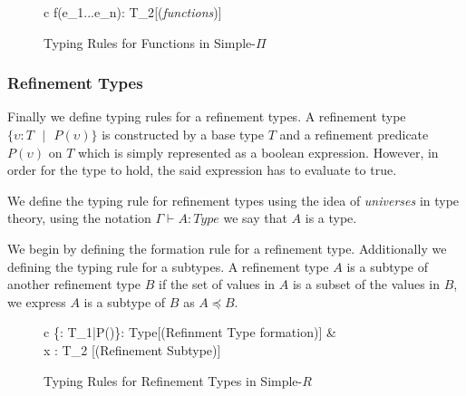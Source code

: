 \documentclass[a4paper,12pt]{report}
\begin{document}
\begin{figure}[H]
  \begin{center}
    \begin{tabular} {c}
        {\Gamma \vdash f(e_1...e_n): T_2}[(\textit{functions})]
    \end{tabular}
  \end{center}
  \caption{Typing Rules for Functions in Simple-$\Pi$}
\end{figure}

\subsubsection{Refinement Types}
Finally we define typing rules for a refinement types. A refinement type 
$\{\upsilon : T\text{ }|\text{ }P(\upsilon)\}$ is constructed by a base type $T$ 
and a refinement predicate $P(\upsilon)$ on $T$ which is 
simply represented as a boolean expression. However, in order for the type to 
hold, the said expression has to evaluate to true. 

\par
We define the typing rule for refinement types using the idea of 
\textit{universes} \cite{martinLof} in type theory, using the notation 
$\Gamma \vdash A : Type$ we say that $A$ is a type. 


\par
We begin by defining the formation rule for a refinement type. Additionally we 
defining the typing rule for a subtypes. A refinement type $A$ is a subtype of 
another refinement type $B$ if the set of values in $A$ is a subset of the 
values in $B$, we express $A$ is a subtype of $B$ as $A \preceq B$.

\begin{figure}[H]
  \begin{center}
    \begin{tabular} {c}
        {\Gamma \vdash \{\upsilon : T_1\text{ }|\text{ }P(\upsilon)\}: Type}[(Refinment Type formation)]
      & \\
      {\Gamma \vdash x : T_2} [(Refinement Subtype)]
    \end{tabular}
  \end{center}
  \caption{Typing Rules for Refinement Types in Simple-$R$}
\end{figure}
\end{document}
